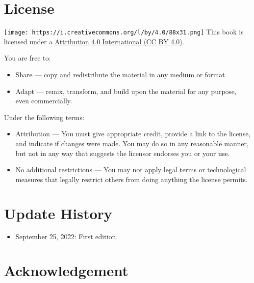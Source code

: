 \documentclass[
  letterpaper,
  DIV=11,
  numbers=noendperiod]{scrreprt}
\providecommand{\tightlist}{%
  \setlength{\itemsep}{0pt}\setlength{\parskip}{0pt}}\usepackage{longtable,booktabs,array}
\begin{document}
\hypertarget{license}{%
\section*{License}\label{license}}

\texttt{[image: https://i.creativecommons.org/l/by/4.0/88x31.png]} This
book is licensed under a
\href{https://creativecommons.org/licenses/by/4.0/}{Attribution 4.0
International (CC BY 4.0)}.

You are free to:

\begin{itemize}
\tightlist
\item
  Share --- copy and redistribute the material in any medium or format
\item
  Adapt --- remix, transform, and build upon the material for any
  purpose, even commercially.
\end{itemize}

Under the following terms:

\begin{itemize}
\tightlist
\item
  Attribution --- You must give appropriate credit, provide a link to
  the license, and indicate if changes were made. You may do so in any
  reasonable manner, but not in any way that suggests the licensor
  endorses you or your use.
\item
  No additional restrictions --- You may not apply legal terms or
  technological measures that legally restrict others from doing
  anything the license permits.
\end{itemize}

\hypertarget{update-history}{%
\section*{Update History}\label{update-history}}

\begin{itemize}
\tightlist
\item
  September 25, 2022: First edition.
\end{itemize}

\hypertarget{acknowledgement}{%
\section*{Acknowledgement}\label{acknowledgement}}
\end{document}
